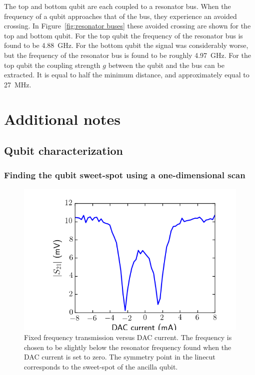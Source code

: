     The top and bottom qubit are each coupled to a resonator bus. When the frequency of a qubit approaches that of the bus, they experience an avoided crossing. In Figure~\ref{fig:resonator buses} these avoided crossing are shown for the top and bottom qubit. For the top qubit the frequency of the resonator bus is found to be \SI{4.88}{\giga \hertz}. For the bottom qubit the signal was considerably worse, but the frequency of the resonator bus is found to be roughly \SI{4.97}{\giga \hertz}. For the top qubit the coupling strength $g$ between the qubit and the bus can be extracted. It is equal to half the minimum distance, and approximately equal to \SI{27}{\mega \hertz}.

\chapter{Additional notes}
  \section{Qubit characterization}
      \subsection{Finding the qubit sweet-spot using a one-dimensional scan}
        \label{Finding the qubit sweet-spot using a one-dimensional scan}
        \begin{figure}[tb]
          \centering
          \includegraphics[width=.6\linewidth]{../Figures/Qubit characterization/Resonator vs DAC linecut.png}
          \caption{Fixed frequency transmission versus DAC current. The frequency is chosen to be slightly below the resonator frequency found when the DAC current is set to zero. The symmetry point in the linecut corresponds to the sweet-spot of the ancilla qubit.}
          \label{fig:resonator vs dac linecut}
        \end{figure}

